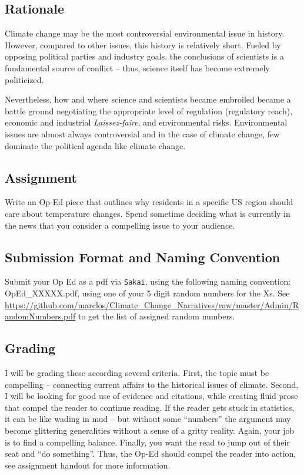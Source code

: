 
\subsection{Rationale}

Climate change may be the most controversial environmental issue in history. However, compared to other issues, this history is relatively short. Fueled by opposing political parties and industry goals, the conclusions of scientists is a fundamental source of conflict -- thus, science itself has become extremely politicized. 

Nevertheless, how and where science and scientists became embroiled became a battle ground negotiating the appropriate level of regulation (regulatory reach), economic and industrial \textit{Laissez-faire}, and environmental risks. Environmental issues are almost always controversial and in the case of climate change, few dominate the political agenda like climate change. 

\subsection{Assignment}

Write an Op-Ed piece that outlines why residents in a specific US region should care about temperature changes. Spend sometime deciding what is currently in the news that you consider a compelling issue to your audience.

\subsection{Submission Format and Naming Convention}

Submit your Op Ed as a pdf via \texttt{Sakai}, using the following naming convention: OpEd\_XXXXX.pdf, using one of your 5 digit random numbers for the Xs. See \url{https://github.com/marclos/Climate_Change_Narratives/raw/master/Admin/RandomNumbers.pdf} to get the list of assigned random numbers. 

\subsection{Grading}

I will be grading these according several criteria. First, the topic must be compelling -- connecting current affairs to the historical issues of climate. Second, I will be looking for good use of evidence and citations, while creating fluid prose that compel the reader to continue reading. If the reader gets stuck in statistics, it can be like wading in mud -- but without some ``numbers'' the argument may become glittering generalities without a sense of a gritty reality. Again, your job is to find a compelling balance. Finally, you want the read to jump out of their seat and ``do something''. Thus, the Op-Ed should compel the reader into action, see assignment handout for more information.





